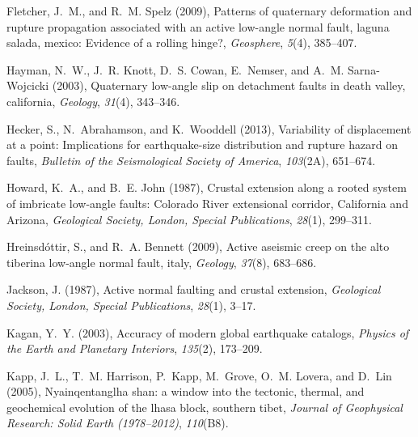\documentclass[twocolumn,grl]{AGUTeX}
\begin{document}
\begin{article}
\begin{thebibliography}{28}
Fletcher, J.~M., and R.~M. Spelz (2009), Patterns of quaternary deformation and
  rupture propagation associated with an active low-angle normal fault, laguna
  salada, mexico: Evidence of a rolling hinge?, \textit{Geosphere},
  \textit{5}(4), 385--407.

Hayman, N.~W., J.~R. Knott, D.~S. Cowan, E.~Nemser, and A.~M. Sarna-Wojcicki
  (2003), Quaternary low-angle slip on detachment faults in death valley,
  california, \textit{Geology}, \textit{31}(4), 343--346.

Hecker, S., N.~Abrahamson, and K.~Wooddell (2013), Variability of displacement
  at a point: Implications for earthquake-size distribution and rupture hazard
  on faults, \textit{Bulletin of the Seismological Society of America},
  \textit{103}(2A), 651--674.

Howard, K.~A., and B.~E. John (1987), Crustal extension along a rooted system
  of imbricate low-angle faults: {Colorado River} extensional corridor,
  {California} and {Arizona}, \textit{Geological Society, London, Special
  Publications}, \textit{28}(1), 299--311.

Hreinsd{\'o}ttir, S., and R.~A. Bennett (2009), Active aseismic creep on the
  alto tiberina low-angle normal fault, italy, \textit{Geology},
  \textit{37}(8), 683--686.

Jackson, J. (1987), Active normal faulting and crustal extension,
  \textit{Geological Society, London, Special Publications}, \textit{28}(1),
  3--17.

Kagan, Y.~Y. (2003), Accuracy of modern global earthquake catalogs,
  \textit{Physics of the Earth and Planetary Interiors}, \textit{135}(2),
  173--209.

Kapp, J.~L., T.~M. Harrison, P.~Kapp, M.~Grove, O.~M. Lovera, and D.~Lin
  (2005), Nyainqentanglha shan: a window into the tectonic, thermal, and
  geochemical evolution of the lhasa block, southern tibet, \textit{Journal of
  Geophysical Research: Solid Earth (1978--2012)}, \textit{110}(B8).


\end{thebibliography}
\end{article}
\end{document}
